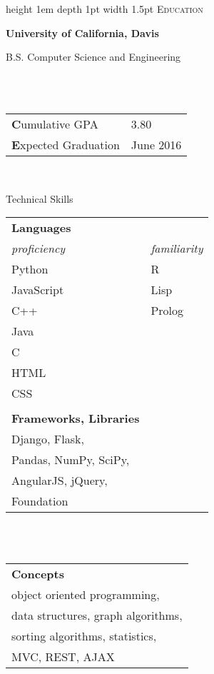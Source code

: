 \documentclass[letterpaper]{article}
\newcommand{\sectiontitle}[1]{
	{\color{magenta} \vline height 1em depth 1pt width 1.5pt}%
	{\large \colorbox{offwhite}{\color{black} \textsc{#1}}}
	\vspace*{0.5em}
}
\newcommand{\sectionseparator}[1]{
	\hline
	\vspace*{1em}
}
\begin{document}
	\begin{minipage}[t]{0.35\textwidth}
	
		\sectiontitle{Education}
		
		\textbf{University of California, Davis} 
		\\
		\begin{small}
			B.S. Computer Science and Engineering
		\end{small}
		\\
		\vspace*{1em}
		\\
		\begin{tabular}{l l}
			{\textbf Cumulative GPA} & {3.80} \\
			{\textbf Expected Graduation} & {June 2016} \\
		\end{tabular}
		\\
		\vspace*{1em}

		\sectionseparator

		\sectiontitle{Technical Skills}
		
		\begin{tabular}{l l}
			\textbf{Languages} 		\\
			\textit{proficiency} 	& \textit{familiarity} \\
			Python 					& R \\
			JavaScript 				& Lisp \\
			C++ 					& Prolog \\
			Java 					& \\
			C 						& \\
			HTML 					& \\
			CSS						& \\
			{}						& \\
			\textbf{Frameworks, Libraries} 	\\
			Django, Flask, \\
			Pandas, NumPy, SciPy, \\
			AngularJS, jQuery, \\
			Foundation
		\end{tabular}
		\\
		\vspace*{1em}
		\\
		\begin{tabular}{l}
			\textbf{Concepts} \\
			object oriented programming, \\ 
			data structures, graph algorithms, \\
			sorting algorithms, statistics, \\
			MVC, REST, AJAX \\
		\end{tabular}			
		\vspace*{1em}
		

\end{minipage}
\end{document}

